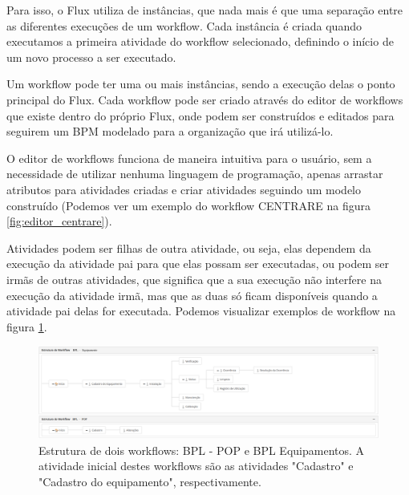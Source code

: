 Para isso, o Flux utiliza de instâncias, que nada mais é que uma separação entre as diferentes execuções de um workflow. Cada instância é criada quando executamos a primeira atividade do workflow selecionado, definindo o início de um novo processo a ser executado.

Um workflow pode ter uma ou mais instâncias, sendo a execução delas o ponto principal do Flux.
Cada workflow pode ser criado através do editor de workflows que existe dentro do próprio Flux, onde podem ser construídos e editados para seguirem um BPM modelado para a organização que irá utilizá-lo.

O editor de workflows funciona de maneira intuitiva para o usuário, sem a necessidade de utilizar nenhuma linguagem de programação, apenas arrastar atributos para atividades criadas e criar atividades seguindo um modelo construído (Podemos ver um exemplo do workflow CENTRARE na figura \ref{fig:editor_centrare}).

Atividades podem ser filhas de outra atividade, ou seja, elas dependem da execução da atividade pai para que elas possam ser executadas, ou podem ser irmãs de outras atividades, que significa que a sua execução não interfere na execução da atividade irmã, mas que as duas só ficam disponíveis quando a atividade pai delas for executada. Podemos visualizar exemplos de workflow na figura \ref{fig:estrutura_workflow}.

\begin{figure}
    \centering
    \includegraphics[width=1\textwidth]{imgs/BPL/estrutura.png}
    \caption{Estrutura de dois workflows: BPL - POP e BPL Equipamentos. A atividade inicial destes workflows são as atividades "Cadastro" e "Cadastro do equipamento", respectivamente.}
    \label{fig:estrutura_workflow}
\end{figure}

